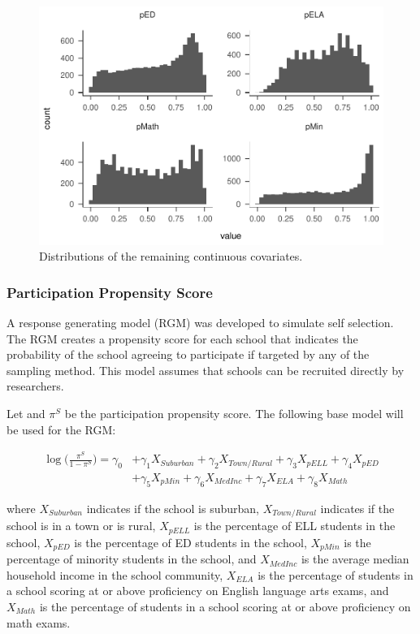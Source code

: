 \documentclass[man,floatsintext]{apa6}
\begin{document}
\begin{figure}
\centering
\includegraphics{GenSamp_Paper_files/figure-latex/plot-dist2-1.pdf}
\caption{\label{fig:plot-dist2}Distributions of the remaining continuous covariates.}
\end{figure}

\hypertarget{participation-propensity-score}{%
\subsubsection{Participation Propensity Score}\label{participation-propensity-score}}

A response generating model (RGM) was developed to simulate self selection. The RGM creates a propensity score for each school that indicates the probability of the school agreeing to participate if targeted by any of the sampling method. This model assumes that schools can be recruited directly by researchers.

Let and \(\pi^S\) be the participation propensity score. The following base model will be used for the RGM:

\begin{align} \label{eq:sRGM}
  \log\bigg(\frac{\pi^S}{1-\pi^S}\bigg) = \gamma_{0} &+ \gamma_{1}X_{Suburban} + \gamma_{2}X_{Town/Rural} + \gamma_{3}X_{pELL} + \gamma_{4}X_{pED} 
  \\
  &+ \gamma_{5}X_{pMin} + \gamma_{6}X_{MedInc} + \gamma_{7}X_{ELA} + \gamma_{8}X_{Math} \nonumber
\end{align}

where \(X_{Suburban}\) indicates if the school is suburban, \(X_{Town/Rural}\) indicates if the school is in a town or is rural, \(X_{pELL}\) is the percentage of ELL students in the school, \(X_{pED}\) is the percentage of ED students in the school, \(X_{pMin}\) is the percentage of minority students in the school, and \(X_{MedInc}\) is the average median household income in the school community, \(X_{ELA}\) is the percentage of students in a school scoring at or above proficiency on English language arts exams, and \(X_{Math}\) is the percentage of students in a school scoring at or above proficiency on math exams.
\end{document}
